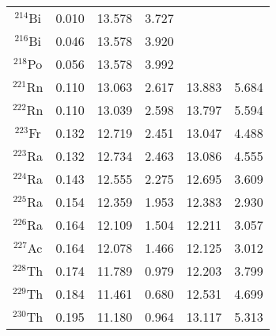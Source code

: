 \documentclass[twocolumn,showpacs,superscriptaddress,amsmath,amssymb,prc,preprintnumbers]{revtex4-1}
\begin{document}
\begin{center}
\begin{longtable}{c@{\extracolsep{\fill}}ccccc}
        $^{214}$Bi & 0.010  & 13.578  & 3.727  &  &  \\
        $^{216}$Bi & 0.046  & 13.578  & 3.920  &  &  \\
        $^{218}$Po & 0.056  & 13.578  & 3.992  &  &  \\
        $^{221}$Rn & 0.110  & 13.063  & 2.617  & 13.883  & 5.684  \\
        $^{222}$Rn & 0.110  & 13.039  & 2.598  & 13.797  & 5.594  \\
        $^{223}$Fr & 0.132  & 12.719  & 2.451  & 13.047  & 4.488  \\
        $^{223}$Ra & 0.132  & 12.734  & 2.463  & 13.086  & 4.555  \\
        $^{224}$Ra & 0.143  & 12.555  & 2.275  & 12.695  & 3.609  \\
        $^{225}$Ra & 0.154  & 12.359  & 1.953  & 12.383  & 2.930  \\
        $^{226}$Ra & 0.164  & 12.109  & 1.504  & 12.211  & 3.057  \\
        $^{227}$Ac & 0.164  & 12.078  & 1.466  & 12.125  & 3.012  \\
        $^{228}$Th & 0.174  & 11.789  & 0.979  & 12.203  & 3.799  \\
        $^{229}$Th & 0.184  & 11.461  & 0.680  & 12.531  & 4.699  \\
        $^{230}$Th & 0.195  & 11.180  & 0.964  & 13.117  & 5.313  \\  \hline
\end{longtable}




\newpage

\end{center}
%
%
\end{document}
